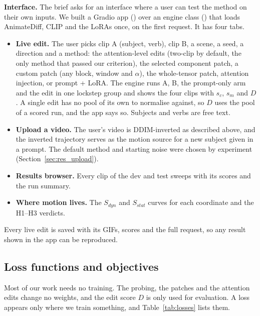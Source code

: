 \documentclass[twoside,english]{article}
\begin{document}
\textbf{Interface.} The brief asks for an interface where a user can test the method on their own
inputs. We built a Gradio app () over an engine class () that
loads AnimateDiff, CLIP and the LoRAs once, on the first request. It has four tabs.
\begin{itemize}
\item \textbf{Live edit.} The user picks clip A (subject, verb), clip B, a scene, a seed, a direction and
  a method: the attention-level edits (two-clip by default, the only method that passed our criterion),
  the selected component patch, a custom patch (any block, window and $\alpha$), the whole-tensor patch,
  attention injection, or prompt + LoRA. The engine runs A, B, the prompt-only arm and the edit in one
  lockstep group and shows the four clips with $s_c$, $s_m$ and $D$. A single edit has no pool of its own to
  normalise against, so $D$ uses the pool of a scored run, and the app says so. Subjects and verbs are free
  text.
\item \textbf{Upload a video.} The user's video is DDIM-inverted as described above, and the inverted
  trajectory serves as the motion source for a new subject given in a prompt. The default method and
  starting noise were chosen by experiment (Section~\ref{sec:res_upload}).
\item \textbf{Results browser.} Every clip of the dev and test sweeps with its scores and the run summary.
\item \textbf{Where motion lives.} The $S_{dyn}$ and $S_{stat}$ curves for each coordinate and the H1--H3
  verdicts.
\end{itemize}
Every live edit is saved with its GIFs, scores and the full request, so any result shown in the app can
be reproduced.

\subsection{Loss functions and objectives} \label{sec:losses}

Most of our work needs no training. The probing, the patches and the attention edits change no weights,
and the edit score $D$ is only used for evaluation. A loss appears only where we train something, and
Table~\ref{tab:losses} lists them.
\end{document}
